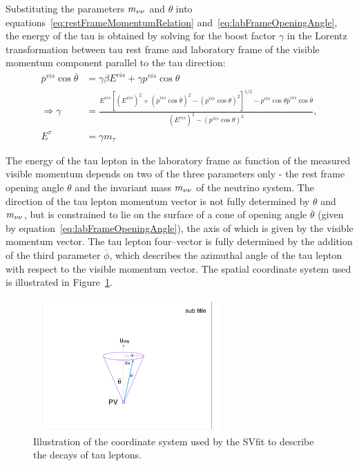 Substituting the parameters $m_{\nu\nu}$ and $\theta$ into
equations~\ref{eq:restFrameMomentumRelation} and~\ref{eq:labFrameOpeningAngle},
the energy of the tau is obtained by solving for the boost factor $\gamma$ in
the Lorentz transformation between tau rest frame and laboratory frame of the
visible momentum component parallel to the tau direction:
\begin{align}
\overline{p}^{vis} \cos \overline{\theta} &= \gamma \beta E^{vis} + \gamma p^{vis} \cos\theta \nonumber \\ 
\Rightarrow \gamma &= \frac{E^{vis}[{\left( E^{vis} \right)^2 + \left( \overline{p}^{vis} \cos \overline{\theta} \right)^2 
 - \left( p^{vis} \cos \theta \right)^2}]^{1/2} - p^{vis} \cos \theta \overline{p}^{vis} \cos \overline{\theta}}{\left( E^{vis} \right)^2 
 - \left( p^{vis} \cos \theta \right)^2}, \nonumber \\
E^{\tau} &= \gamma m_\tau \nonumber
\end{align}

The energy of the tau lepton in the laboratory frame as function of the measured
visible momentum depends on two of the three parameters only - the rest frame
opening angle $\theta$ and the invariant mass $m_{\nu\nu}$ of the neutrino system.
The direction of the tau lepton momentum vector is not fully determined by
$\theta$ and $m_{\nu\nu}$, but is constrained to lie on the surface of a cone of
opening angle $\overline{\theta}$ (given by equation~\ref{eq:labFrameOpeningAngle}),
the axis of which is given by the visible momentum vector.  The tau lepton
four--vector is fully determined by the addition of the third parameter
$\overline{\phi}$, which describes the azimuthal angle of the tau lepton with respect
to the visible momentum vector.  The spatial coordinate system used is
illustrated in Figure~\ref{fig:svFitDecayParDiagram}.

\begin{figure}[t]
\begin{center}
\includegraphics*[width=72mm]{svfit_chapter/figures/decay_parameters_graphic.pdf}
\caption{Illustration of the coordinate system used by the SVfit to describe
the decays of tau leptons.} \label{fig:svFitDecayParDiagram}
\end{center}
\end{figure} 


